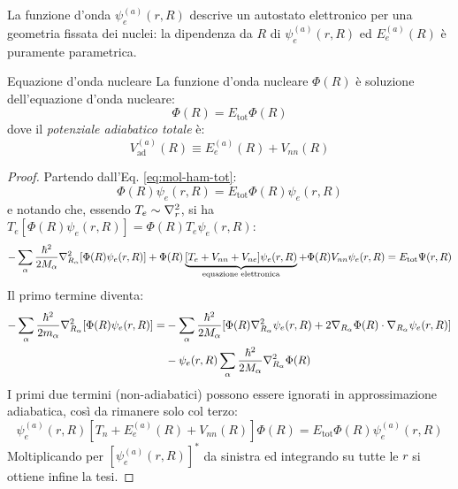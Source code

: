 La funzione d'onda $ \psi_e^{(a)}(r,R) $ descrive un autostato elettronico per una geometria fissata dei nuclei: la dipendenza da $ R $ di $ \psi_e^{(a)}(r,R) $ ed $ E_e^{(a)}(R) $ è puramente parametrica.

\begin{proposition}{Equazione d'onda nucleare}{}
	La funzione d'onda nucleare $ \Phi(R) $ è soluzione dell'equazione d'onda nucleare:
	\begin{equation}
		[T_n + V_\text{ad}^{(a)}(R)] \Phi(R) = E_\text{tot} \Phi(R)
		\label{eq:mol-nucl-eq}
	\end{equation}
	dove il \textit{potenziale adiabatico totale} è:
	\begin{equation}
		V_\text{ad}^{(a)}(R) \equiv E_e^{(a)}(R) + V_{nn}(R)
		\label{eq:ad-pot}
	\end{equation}

	\tcblower

	\begin{proof}
		Partendo dall'Eq. \ref{eq:mol-ham-tot}:
		\begin{equation*}
			[T_n + T_e + V_{nn} + V_{ne} + V_{ee}] \Phi(R) \psi_e(r,R) = E_\text{tot} \Phi(R) \psi_e(r,R)
		\end{equation*}
		e notando che, essendo $ T_e \sim \nabla^2_r $, si ha $ T_e [\Phi(R) \psi_e(r,R)] = \Phi(R) T_e \psi_e(r,R) $:
		\begin{equation*}
			- \sum_\alpha \frac{\hbar^2}{2M_\alpha} \nabla^2_{R_\alpha} [\Phi(R) \psi_e(r,R)] + \Phi(R) \underbrace{[T_e + V_{nn} + V_{ne}] \psi_e(r,R)}_{\text{equazione elettronica}} + \Phi(R) V_{nn} \psi_e(r,R) = E_\text{tot} \Psi(r,R)
		\end{equation*}
		Il primo termine diventa:
		\begin{equation*}
			\begin{split}
				- \sum_\alpha \frac{\hbar^2}{2m_\alpha} \nabla^2_{R_\alpha} [\Phi(R) \psi_e(r,R)]
				= & - \sum_\alpha \frac{\hbar^2}{2M_\alpha} [\Phi(R) \nabla^2_{R_\alpha} \psi_e(r,R) + 2 \nabla_{R_\alpha} \Phi(R) \cdot \nabla_{R_\alpha} \psi_e(r,R)] \\
				& - \psi_e(r,R) \sum_\alpha \frac{\hbar^2}{2M_\alpha} \nabla^2_{R_\alpha} \Phi(R)
			\end{split}
		\end{equation*}
		I primi due termini (non-adiabatici) possono essere ignorati in approssimazione adiabatica, così da rimanere solo col terzo:
		\begin{equation*}
			\psi_e^{(a)}(r,R) [T_n + E_e^{(a)}(R) + V_{nn}(R)] \Phi(R) = E_\text{tot} \Phi(R) \psi_e^{(a)}(r,R)
		\end{equation*}
		Moltiplicando per $ [\psi_e^{(a)}(r,R)]^* $ da sinistra ed integrando su tutte le $ r $ si ottiene infine la tesi.
	\end{proof}
\end{proposition}

